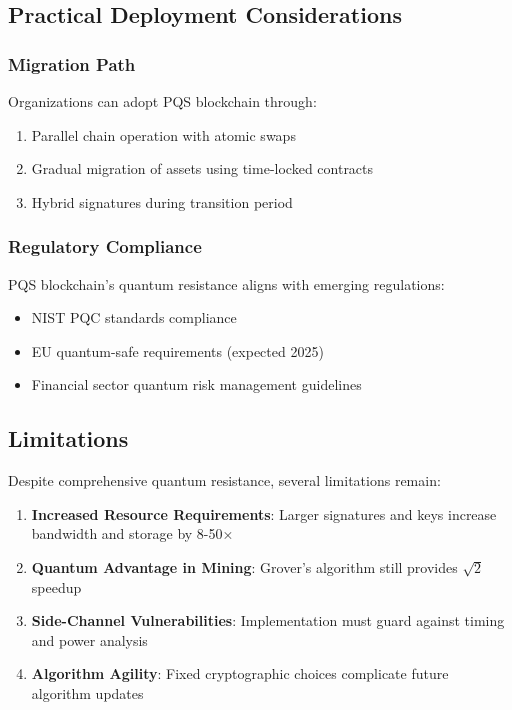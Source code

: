 \documentclass[12pt,a4paper]{article}
\begin{document}
\subsection{Practical Deployment Considerations}

\subsubsection{Migration Path}
Organizations can adopt PQS blockchain through:
\begin{enumerate}
\item Parallel chain operation with atomic swaps
\item Gradual migration of assets using time-locked contracts
\item Hybrid signatures during transition period
\end{enumerate}

\subsubsection{Regulatory Compliance}
PQS blockchain's quantum resistance aligns with emerging regulations:
\begin{itemize}
\item NIST PQC standards compliance
\item EU quantum-safe requirements (expected 2025)
\item Financial sector quantum risk management guidelines
\end{itemize}

\subsection{Limitations}

Despite comprehensive quantum resistance, several limitations remain:

\begin{enumerate}
\item \textbf{Increased Resource Requirements}: Larger signatures and keys increase bandwidth and storage by 8-50×
\item \textbf{Quantum Advantage in Mining}: Grover's algorithm still provides $\sqrt{2}$ speedup
\item \textbf{Side-Channel Vulnerabilities}: Implementation must guard against timing and power analysis
\item \textbf{Algorithm Agility}: Fixed cryptographic choices complicate future algorithm updates
\end{enumerate}
\end{document}
